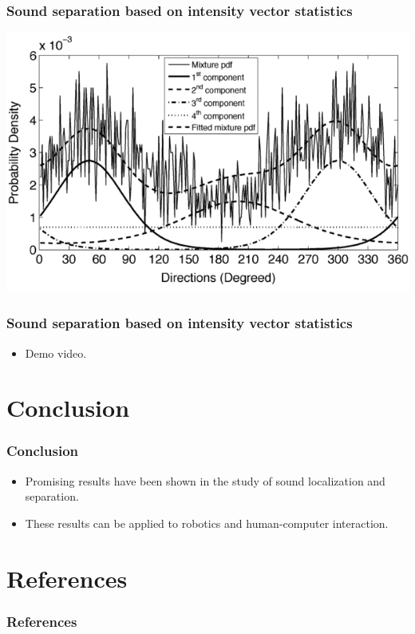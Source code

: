 \documentclass{beamer}
\begin{document}
\begin{frame}
\frametitle{Sound separation based on intensity vector statistics\cite{gunel_acoustic_2008}}
\begin{center}
  \includegraphics[width=.9\textwidth]{sep1}
\end{center}
\end{frame}

\begin{frame}
\frametitle{Sound separation based on intensity vector statistics\cite{gunel_acoustic_2008}}
\begin{itemize}
  \item Demo video.
\end{itemize}
\end{frame}

\section{Conclusion}

\begin{frame}
\frametitle{Conclusion}
\begin{itemize}
  \item Promising results have been shown in the study of sound localization and separation.
  \item These results can be applied to robotics and human-computer interaction.
\end{itemize}
\end{frame}

\section*{References}
\begin{frame}[allowframebreaks]
  \frametitle{References}
  {\footnotesize
  
    
  }
\end{frame}
\end{document}
